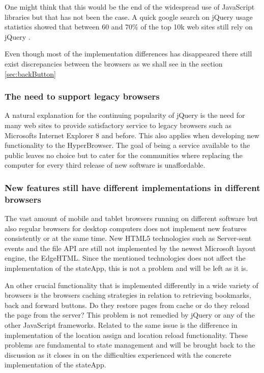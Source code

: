 \documentclass[english]{ifimaster}
\begin{document}
One might think that this would be the end of the widespread use of JavaScript libraries but that has not been the case. A quick google search on jQuery usage statistics showed that between 60 and 70\% of the top 10k web sites still rely on jQuery \parencite{jQueryWiki} \parencite{jQueryW3Tech}\parencite{builtWith}. 

Even though most of the implementation differences has disappeared there still exist discrepancies between the browsers as we shall see in the section \ref{sec:backButton} 

\subsubsection{The need to support legacy browsers}
A natural explanation for the continuing popularity of jQuery is the need for many web sites to provide satisfactory service to legacy browsers such as Microsofts Internet Explorer 8 and before. This also applies when developing new functionality to the HyperBrowser. The goal of being a service available to the public leaves no choice but to cater for the communities where replacing the computer for every third release of new software is unaffordable. 



\subsubsection{New features still have different implementations in different browsers}
The vast amount of mobile and tablet browsers running on different software but also regular browsers for desktop computers does not implement new features consistently or at the same time. New HTML5 technologies such as Server-sent events and the file API are still not implemented by the newest Microsoft layout engine, the EdgeHTML\parencite{comparison_of_layout_engines}. Since the mentioned technologies does not affect the implementation of the stateApp, this is not a problem and will be left as it is.

An other crucial functionality that is implemented differently in a wide variety of browsers is the browsers caching strategies in relation to retrieving bookmarks, back and forward buttons. Do they restore pages from cache or do they reload the page from the server? This problem is not remedied by jQuery or any of the other JavaScript frameworks. Related to the same issue is the difference in implementation of the location assign and location reload functionality. These problems are fundamental to state management and will be brought back to the discussion as it closes in on the difficulties experienced with the concrete implementation of the stateApp. 
\end{document}
